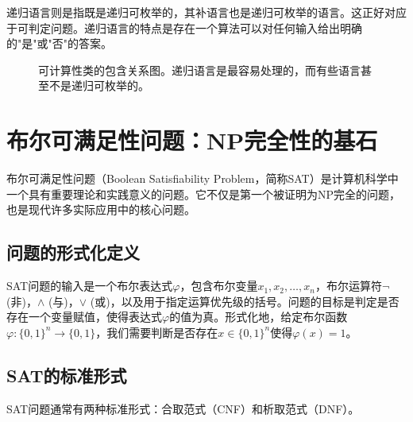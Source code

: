 \documentclass[a4paper,12pt]{ctexart}
\begin{document}
递归语言则是指既是递归可枚举的，其补语言也是递归可枚举的语言。这正好对应于可判定问题。递归语言的特点是存在一个算法可以对任何输入给出明确的"是"或"否"的答案。

\begin{figure}[H]
    \centering
    \caption{可计算性类的包含关系图。递归语言是最容易处理的，而有些语言甚至不是递归可枚举的。}
    \label{fig:computability_classes}
\end{figure}

\section{布尔可满足性问题：NP完全性的基石}
布尔可满足性问题（Boolean Satisfiability Problem，简称SAT）是计算机科学中一个具有重要理论和实践意义的问题。它不仅是第一个被证明为NP完全的问题，也是现代许多实际应用中的核心问题。

\subsection{问题的形式化定义}
SAT问题的输入是一个布尔表达式$\varphi$，包含布尔变量$x_1, x_2, \ldots, x_n$，布尔运算符$\neg$ (非)，$\wedge$ (与)，$\vee$ (或)，以及用于指定运算优先级的括号。问题的目标是判定是否存在一个变量赋值，使得表达式$\varphi$的值为真。形式化地，给定布尔函数$\varphi: \{0,1\}^n \rightarrow \{0,1\}$，我们需要判断是否存在$x \in \{0,1\}^n$使得$\varphi(x) = 1$。

\subsection{SAT的标准形式}
SAT问题通常有两种标准形式：合取范式（CNF）和析取范式（DNF）。
\end{document}
